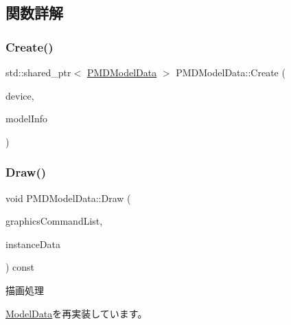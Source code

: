 \subsection{関数詳解}
\mbox{\label{class_p_m_d_model_data_a026bc021f9c229a820054b50821d9171}} 
\subsubsection{\texorpdfstring{Create()}{Create()}}
{\footnotesize\ttfamily std\+::shared\+\_\+ptr$<$ \mbox{\hyperlink{class_p_m_d_model_data}{P\+M\+D\+Model\+Data}} $>$ P\+M\+D\+Model\+Data\+::\+Create (\begin{DoxyParamCaption}\item[{std\+::shared\+\_\+ptr$<$ \mbox{\hyperlink{class_device}{Device}} $>$}]{device,  }\item[{const \mbox{\hyperlink{struct_p_m_d_model_info}{P\+M\+D\+Model\+Info}} \&}]{model\+Info }\end{DoxyParamCaption})\hspace{0.3cm}{\ttfamily [static]}}

\mbox{\label{class_p_m_d_model_data_ae811d49854ae659f20ac9be60a5fb146}} 
\subsubsection{\texorpdfstring{Draw()}{Draw()}}
{\footnotesize\ttfamily void P\+M\+D\+Model\+Data\+::\+Draw (\begin{DoxyParamCaption}\item[{Com\+Ptr$<$ I\+D3\+D12\+Graphics\+Command\+List $>$}]{graphics\+Command\+List,  }\item[{const \mbox{\hyperlink{struct_instance_data}{Instance\+Data}} \&}]{instance\+Data }\end{DoxyParamCaption}) const\hspace{0.3cm}{\ttfamily [virtual]}}



描画処理 



\mbox{\hyperlink{class_model_data_a774032c8dac7355ad2657c83cf0d1e21}{Model\+Data}}を再実装しています。

